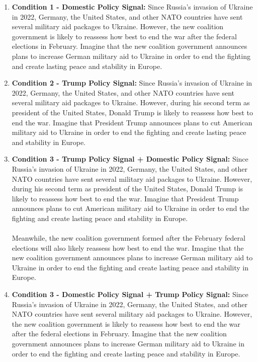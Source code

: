 \begin{appendices}
\begin{enumerate}
\begin{enumerate}
        \item \textbf{Condition 1 - Domestic Policy Signal:} Since Russia's invasion of Ukraine in 2022, Germany, the United States, and other NATO countries have sent several military aid packages to Ukraine. However, the new coalition government is likely to reassess how best to end the war after the federal elections in February. Imagine that the new coalition government announces plans to increase German military aid to Ukraine in order to end the fighting and create lasting peace and stability in Europe.
        \item \textbf{Condition 2 - Trump Policy Signal:} Since Russia's invasion of Ukraine in 2022, Germany, the United States, and other NATO countries have sent several military aid packages to Ukraine. However, during his second term as president of the United States, Donald Trump is likely to reassess how best to end the war. Imagine that President Trump announces plans to cut American military aid to Ukraine in order to end the fighting and create lasting peace and stability in Europe.
        \item \textbf{Condition 3 - Trump Policy Signal + Domestic Policy Signal:} Since Russia's invasion of Ukraine in 2022, Germany, the United States, and other NATO countries have sent several military aid packages to Ukraine. However, during his second term as president of the United States, Donald Trump is likely to reassess how best to end the war. Imagine that President Trump announces plans to cut American military aid to Ukraine in order to end the fighting and create lasting peace and stability in Europe. 
        \paragraph{}
        Meanwhile, the new coalition government formed after the February federal elections will also likely reassess how best to end the war. Imagine that the new coalition government announces plans to increase German military aid to Ukraine in order to end the fighting and create lasting peace and stability in Europe.
        \item \textbf{Condition 3 - Domestic Policy Signal + Trump Policy Signal:} Since Russia's invasion of Ukraine in 2022, Germany, the United States, and other NATO countries have sent several military aid packages to Ukraine. However, the new coalition government is likely to reassess how best to end the war after the federal elections in February. Imagine that the new coalition government announces plans to increase German military aid to Ukraine in order to end the fighting and create lasting peace and stability in Europe.

\end{enumerate}
\end{enumerate}
\end{appendices}

